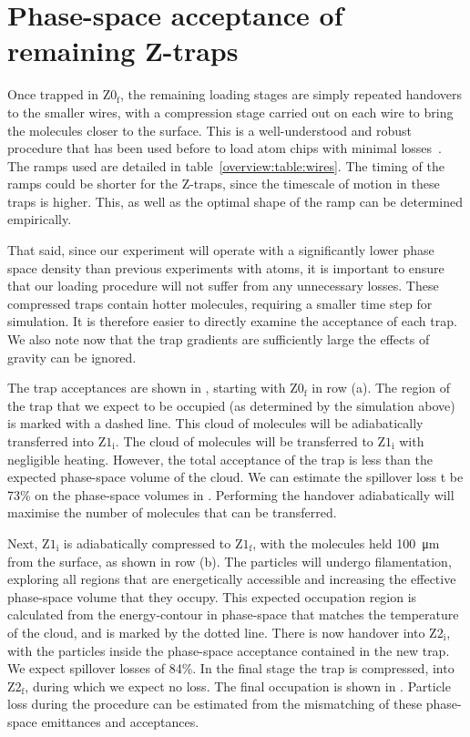 \section{Phase-space acceptance of remaining Z-traps}
\label{sim:transferbetweenzs}

Once trapped in $\mathrm{Z0_f}$, the remaining loading stages are simply
repeated handovers to the smaller wires, with a compression stage carried out
on each wire to bring the molecules closer to the surface. This is a
well-understood and robust procedure that has been used before to load atom
chips with minimal losses~\cite{Reichel2002}. The ramps used are detailed in
table~\ref{overview:table:wires}.  The timing of the ramps could be shorter for
the Z-traps, since the timescale of motion in these traps is higher. This, as
well as the optimal shape of the ramp can be determined empirically.

That said, since our experiment will operate with a significantly lower phase
space density than previous experiments with atoms, it is important to ensure
that our loading procedure will not suffer from any unnecessary losses. These
compressed traps contain hotter molecules, requiring a smaller time step for
simulation. It is therefore easier to directly examine the acceptance of each
trap. We also note now that the trap gradients are sufficiently large the
effects of gravity can be ignored.

The trap acceptances are shown in ,
starting with $\mathrm{Z0_f}$ in row (a). The region of the trap that we expect
to be occupied (as determined by the simulation above) is marked with a dashed
line.  This cloud of molecules will be adiabatically transferred into
$\mathrm{Z1_i}$.
%
The cloud of molecules will be transferred to $\mathrm{Z1_i}$ with negligible
heating. However, the total acceptance of the trap is less than the expected
phase-space volume of the cloud. We can estimate the spillover loss t be 73\%
on the phase-space volumes in
. Performing the handover adiabatically
will maximise the number of molecules that can be transferred.

Next, $\mathrm{Z1_i}$ is adiabatically compressed to $\mathrm{Z1_f}$, with the
molecules held \SI{100}{\micro\meter} from the surface, as shown in row (b).
The particles will undergo filamentation, exploring all regions that are
energetically accessible and increasing the effective phase-space volume that
they occupy. This expected occupation region is calculated from the
energy-contour in phase-space that matches the temperature of the cloud, and is
marked by the dotted line. There is now handover into $\mathrm{Z2_i}$, with the
particles inside the phase-space acceptance contained in the new trap. We
expect spillover losses of 84\%. In the final stage the trap is compressed,
into $\mathrm{Z2_f}$, during which we expect no loss. The final occupation is
shown in .
%
Particle loss during the procedure can be estimated from the mismatching of
these phase-space emittances and acceptances.

